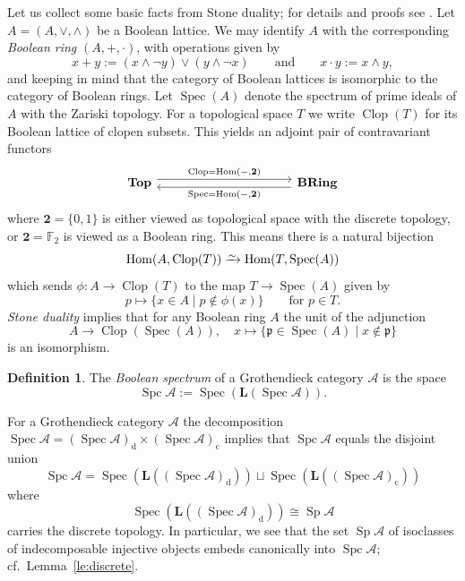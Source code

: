 \documentclass[a4paper]{amsart}
\theoremstyle{plain}
\theoremstyle{definition}
\newtheorem{defn}[thm]{Definition}
\theoremstyle{remark}
\numberwithin{equation}{section}
\newcommand{\Clop}{\operatorname{Clop}}
\newcommand{\Hom}{\operatorname{Hom}}
\newcommand{\Sp}{\operatorname{Sp}}
\newcommand{\Spc}{\operatorname{Spc}}
\newcommand{\Spec}{\operatorname{Spec}}
\newcommand{\BRing}{\mathbf{BRing}}
\newcommand{\Top}{\mathbf{Top}}
\newcommand{\two}{\mathbf{2}}
\newcommand{\iso}{\xrightarrow{\raisebox{-.4ex}[0ex][0ex]{$\scriptstyle{\sim}$}}}
\newcommand{\lto}{\longrightarrow}
\def\A{\mathcal A}
\def\bfL{\mathbf L}
\newcommand{\frp}{\mathfrak{p}}
\def\p{\phi}
\begin{document}
Let us collect some basic facts from Stone duality; for details and
proofs see \cite{DST2019,Jo1982}.  Let $A=(A,\vee, \wedge)$ be a
Boolean lattice. We may identify $A$ with the corresponding
\emph{Boolean ring} $(A,+,\cdot)$, with operations given by
\[x+y:=(x\wedge\neg y)\vee (y\wedge\neg x)\qquad\text{and}\qquad
  x\cdot y:=x\wedge y,\] and keeping in mind that the category of
Boolean lattices is isomorphic to the category of Boolean rings. Let
$\Spec(A)$ denote the spectrum of prime ideals of $A$ with the Zariski
topology. For a topological space $T$ we write $\Clop(T)$ for its
Boolean lattice of clopen subsets. This yields an adjoint pair of
contravariant functors
\[
  \begin{tikzcd}[column sep=large]
    \Top \arrow[rightarrow,yshift=.75ex,rrr,"{\Clop=\Hom(-,\two)}"]
    &&& \arrow[rightarrow,yshift=-.75ex,lll,"{\Spec=\Hom(-,\two)}"]
    \BRing
  \end{tikzcd}
\]
where $\two=\{0,1\}$ is either viewed as topological space with the
discrete topology, or $\two=\mathbb F_2$ is viewed as a Boolean
ring. This means there is a natural bijection
\begin{equation}\label{eq:stone}
 \Hom(A,\Clop(T))\iso\Hom(T,\Spec(A))
\end{equation}
which sends $\p\colon A\to\Clop(T)$ to the map $T\to\Spec(A)$ given by
\[p\longmapsto\{x\in A\mid p\not\in\p(x)\}\qquad\text{for }p\in T.\]
\emph{Stone duality} implies that for any Boolean ring $A$ the
unit of the adjunction
\begin{equation}\label{eq:stone-unit}
  A\lto \Clop(\Spec(A)),\quad x\mapsto\{\frp\in\Spec(A)\mid
  x\not\in\frp\}
\end{equation}  
is an isomorphism.


\begin{defn}
  The \emph{Boolean spectrum} of a Grothendieck category $\A$ is the space
  \[\Spc\A:=\Spec(\bfL(\Spec\A)).\]
\end{defn}

For a Grothendieck category $\A$ the decomposition
$\Spec\A=(\Spec\A)_{\mathrm d}\times (\Spec\A)_{\mathrm c}$ implies
that $\Spc\A$ equals the disjoint union
\begin{equation}\label{eq:Spec-decomposition}
  \Spc\A=\Spec(\bfL((\Spec\A)_{\mathrm d}))\sqcup
  \Spec(\bfL((\Spec\A)_{\mathrm c}))
\end{equation}
where
\[ \Spec(\bfL((\Spec\A)_{\mathrm d}))\cong\Sp\A\] carries the discrete
topology. In particular, we see that the set $\Sp\A$ of
isoclasses of indecomposable injective objects embeds canonically into $\Spc\A$; cf.\
Lemma~\ref{le:discrete}.
\end{document}
